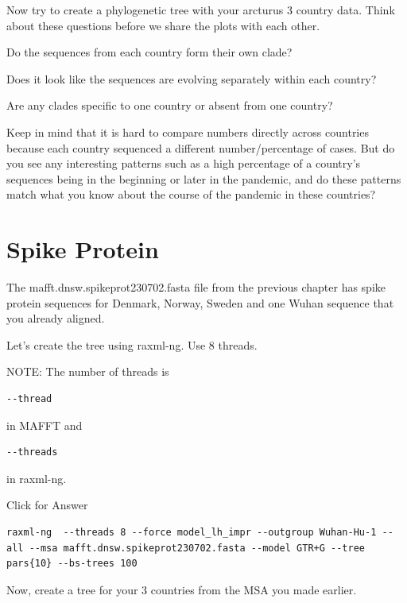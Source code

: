 \documentclass[
]{book}
\begin{document}
\hfill\break

Now try to create a phylogenetic tree with your arcturus 3 country data. Think about these questions before we share the plots with each other.

Do the sequences from each country form their own clade?

Does it look like the sequences are evolving separately within each country?

Are any clades specific to one country or absent from one country?

Keep in mind that it is hard to compare numbers directly across countries because each country sequenced a different number/percentage of cases. But do you see any interesting patterns such as a high percentage of a country's sequences being in the beginning or later in the pandemic, and do these patterns match what you know about the course of the pandemic in these countries?

\hypertarget{spike-protein-1}{%
\section{Spike Protein}\label{spike-protein-1}}

The mafft.dnsw.spikeprot230702.fasta file from the previous chapter has spike protein sequences for Denmark, Norway, Sweden and one Wuhan sequence that you already aligned.

Let's create the tree using raxml-ng. Use 8 threads.

NOTE: The number of threads is

\begin{verbatim}
--thread
\end{verbatim}

in MAFFT and

\begin{verbatim}
--threads
\end{verbatim}

in raxml-ng.

Click for Answer

\begin{verbatim}
raxml-ng  --threads 8 --force model_lh_impr --outgroup Wuhan-Hu-1 --all --msa mafft.dnsw.spikeprot230702.fasta --model GTR+G --tree pars{10} --bs-trees 100
\end{verbatim}

\hfill\break

Now, create a tree for your 3 countries from the MSA you made earlier.
\end{document}

